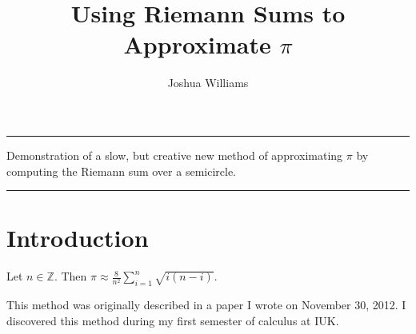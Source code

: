 \documentclass[12pt,a4paper]{article}
\renewenvironment{abstract}{
\hfill\begin{minipage}{0.95\textwidth}
\rule{\textwidth}{1pt}}
{\par\noindent\rule{\textwidth}{1pt}\end{minipage}}
\begin{document}
\title{Using Riemann Sums to Approximate $\pi$}
\author[1]{Joshua Williams}

\maketitle

\begin{abstract}
Demonstration of a slow, but creative new method of approximating $\pi$ by computing the Riemann sum over a semicircle.
\end{abstract}
\section{Introduction}
Let $n \in \mathbb{Z}$. Then $\pi \approx \frac{8}{n^2} \sum\limits_{i=1}^n \sqrt{i(n-i)}$.

This method was originally described in a paper I wrote on November 30, 2012. I discovered this method during my first semester of calculus at IUK.
\end{document}
